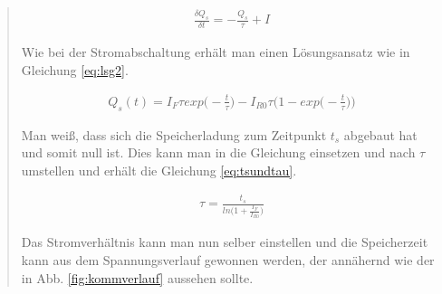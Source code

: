 \begin{quote}
    \begin{equation}
         \begin{split}
            \frac{\delta Q_{s}}{\delta t}=-\frac{Q_{s}}{\tau}+I
             \end{split}
         \label{eq:bilanzzeit}
    \end{equation}

    Wie bei der Stromabschaltung erhält man einen Lösungsansatz wie in Gleichung
    \ref{eq:lsg2}.

    \begin{equation}
         \begin{split}
             Q_{s}(t)=I_{F}\tau exp\Big(-\frac{t}{\tau}\Big)-I_{R0}\tau\Big(1-exp\Big(-\frac{t}{\tau}\Big)\Big)
             \end{split}
         \label{eq:lsg2}
    \end{equation}

    Man weiß, dass sich die Speicherladung zum Zeitpunkt $t_s$ abgebaut hat und
    somit null ist. Dies kann man in die Gleichung einsetzen und nach $\tau$
    umstellen und erhält die Gleichung \ref{eq:tsundtau}.

    \begin{equation}
         \begin{split}
             \tau= \frac{t_s}{ln\Big(1+\frac{I_F}{I_{R0}}\Big)}
             \end{split}
         \label{eq:tsundtau}
    \end{equation}

    Das Stromverhältnis kann man nun selber einstellen und die Speicherzeit kann
    aus dem Spannungsverlauf gewonnen werden, der annähernd wie der in Abb.
    \ref{fig:kommverlauf} aussehen sollte.

    \vspace{2em}


\end{quote}
